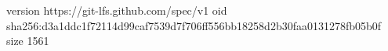 version https://git-lfs.github.com/spec/v1
oid sha256:d3a1ddc1f72114d99caf7539d7f706ff556bb18258d2b30faa0131278fb05b0f
size 1561
